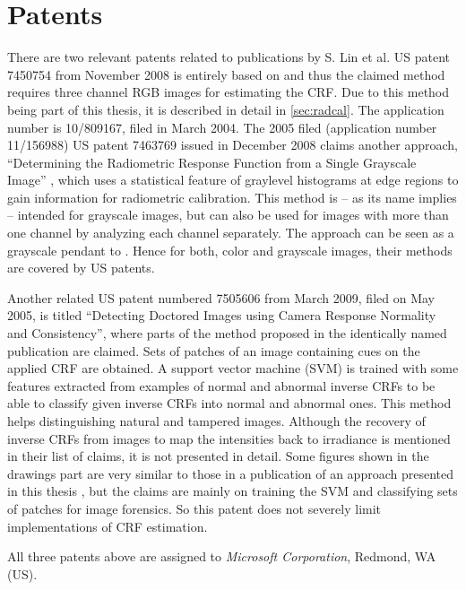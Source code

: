 \section{Patents}
\label{sec:patents}
There are two relevant patents related to publications by S. Lin et \hbox{al.} US patent 7450754 from November 2008 is entirely based on \cite{Lin04radiometriccalibration} and thus the claimed method requires three channel RGB images for estimating the CRF. Due to this method being part of this thesis, it is described in detail in \autoref{sec:radcal}. The application number is 10/809167, filed in March 2004. The 2005 filed (application number 11/156988) US patent 7463769 issued in December 2008 claims another approach, ``Determining the Radiometric Response Function from a Single Grayscale Image'' \cite{lin2005determining}, which uses a statistical feature of graylevel histograms at edge regions to gain information for radiometric calibration. This method is -- as its name implies -- intended for grayscale images, but can also be used for images with more than one channel by analyzing each channel separately. The approach can be seen as a grayscale pendant to \cite{Lin04radiometriccalibration}. Hence for both, color and grayscale images, their methods are covered by US patents.

Another related US patent numbered 7505606 from March 2009, filed on May 2005, is titled ``Detecting Doctored Images using Camera Response Normality and Consistency'', where parts of the method proposed in the identically named publication \cite{rongrong-detecting} are claimed. Sets of patches of an image containing cues on the applied CRF are obtained. A support vector machine (SVM) is trained with some features extracted from examples of normal and abnormal inverse CRFs to be able to classify given inverse CRFs into normal and abnormal ones. This method helps distinguishing natural and tampered images. Although the recovery of inverse CRFs from images to map the intensities back to irradiance is mentioned in their list of claims, it is not presented in detail. Some figures shown in the drawings part are very similar to those in a publication of an approach presented in this thesis \cite{Lin04radiometriccalibration}, but the claims are mainly on training the SVM and classifying sets of patches for image forensics. So this patent does not severely limit implementations of CRF estimation.

All three patents above are assigned to \emph{Microsoft Corporation}, Redmond, WA (US).



